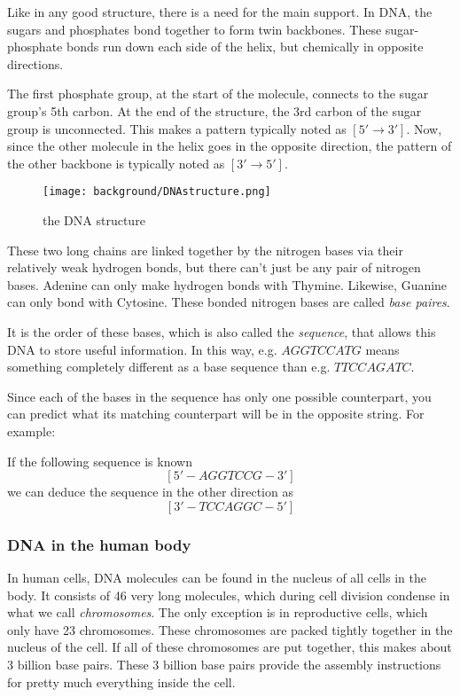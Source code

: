 Like in any good structure, there is a need for the main support. In DNA, the sugars and phosphates bond together to form twin backbones. These sugar-phosphate bonds run down each side of the helix, but chemically in opposite directions. 

The first phosphate group, at the start of the molecule, connects to the sugar group's 5th carbon. At the end of the structure, the 3rd carbon of the sugar group is unconnected. This makes a pattern typically noted as $[5' \rightarrow 3']$. Now, since the other molecule in the helix goes in the opposite direction, the pattern of the other backbone is typically noted as $[3' \rightarrow 5']$.

\begin{figure}[!ht]
	\centering
	\texttt{[image: background/DNAstructure.png]}
	\caption{the DNA structure}
	\label{fig:DNAstructure}
\end{figure}

These two long chains are linked together by the nitrogen bases via their relatively weak hydrogen bonds, but there can't just be any pair of nitrogen bases. Adenine can only make hydrogen bonds with Thymine. Likewise, Guanine can only bond with Cytosine. These bonded nitrogen bases are called \emph{base paires}.

It is the order of these bases, which is also called the \emph{sequence}, that allows this DNA to store useful information. In this way, e.g. $AGGTCCATG$ means something completely different as a base sequence than e.g. $TTCCAGATC$.

Since each of the bases in the sequence has only one possible counterpart, you can predict what its matching counterpart will be in the opposite string. For example:

If the following sequence is known
$$[5' - AGGTCCG - 3']$$
we can deduce the sequence in the other direction as
$$[3' - TCCAGGC - 5']$$

\subsubsection{DNA in the human body}

In human cells, DNA molecules can be found in the nucleus of all cells in the body. It consists of 46 very long molecules, which during cell division condense in what we call \emph{chromosomes}. The only exception is in reproductive cells, which only have 23 chromosomes. These chromosomes are packed tightly together in the nucleus of the cell. If all of these chromosomes are put together, this makes about 3 billion base pairs. These 3 billion base pairs provide the assembly instructions for pretty much everything inside the cell.

